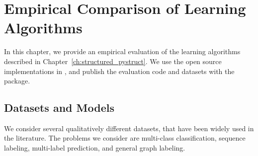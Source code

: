 \chapter{Empirical Comparison of Learning Algorithms}\label{ch:comparison}
In this chapter, we provide an empirical evaluation of the learning algorithms
described in Chapter~\ref{ch:structured_pystruct}.  We use the open source
implementations in \pystruct, and publish the evaluation code and datasets with
the package.

\section{Datasets and Models}
We consider several qualitatively different datasets, that have been widely used in the literature.
The problems we consider are multi-class classification, sequence labeling, multi-label prediction,
and general graph labeling.

